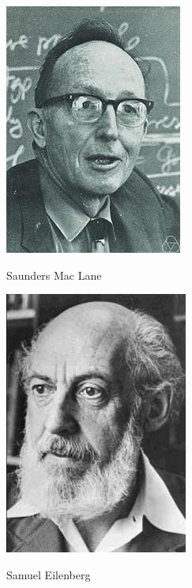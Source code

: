 \documentclass[12pt]{article}
\begin{document}
\begin{center}
\includegraphics[scale=0.6]{maclane}

Saunders Mac Lane
\end{center}

\begin{center}
\includegraphics[scale=0.6]{eilenberg}

Samuel Eilenberg
\end{center}
\end{document}
